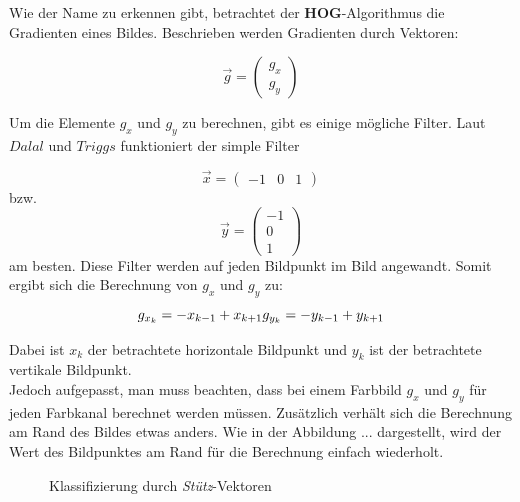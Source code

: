 Wie der Name zu erkennen gibt, betrachtet der \textbf{HOG}-Algorithmus die Gradienten eines Bildes. Beschrieben werden Gradienten durch Vektoren:

$$
\vec{g}=\begin{pmatrix}
	g_x \\
	g_y
\end{pmatrix}
$$

Um die Elemente $g_x$ und $g_y$ zu berechnen, gibt es einige mögliche Filter. Laut $Dalal$ und $Triggs$ \cite[S.5]{dalal:inria-00548512} funktioniert der simple Filter

$$
\vec{x}=\begin{pmatrix}
	-1 & 0 & 1
\end{pmatrix}
$$
bzw.
$$
\vec{y}=\begin{pmatrix}
	-1 \\
	0 \\
	1
\end{pmatrix}
$$
am besten.
Diese Filter werden auf jeden Bildpunkt im Bild angewandt. Somit ergibt sich die Berechnung von $g_x$ und $g_y$ zu:
\begin{equation*}
	g_{x_k}=-x_{k-1}+x_{k+1} \\
	g_{y_k}=-y_{k-1}+y_{k+1}
\end{equation*}

Dabei ist $x_k$ der betrachtete horizontale Bildpunkt und $y_k$ ist der betrachtete vertikale Bildpunkt.\\
Jedoch aufgepasst, man muss beachten, dass bei einem Farbbild $g_x$ und $g_y$ für jeden Farbkanal berechnet werden müssen. Zusätzlich verhält sich die Berechnung am Rand des Bildes etwas anders.
Wie in der Abbildung ... dargestellt, wird der Wert des Bildpunktes am Rand für die Berechnung einfach wiederholt.


\begin{figure}[!h]
\centering


\caption{Klassifizierung durch \emph{Stütz}-Vektoren}
\label{fig:svm_coordinate_system}
\end{figure}

